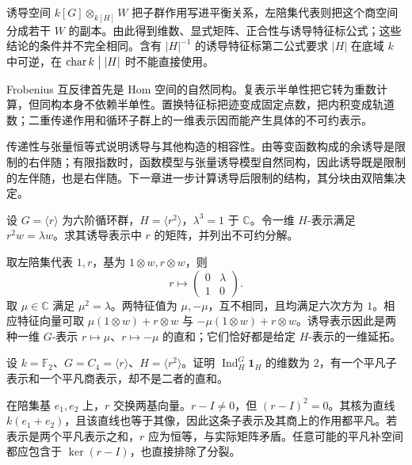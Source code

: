 




\begin{chaptersummary}
	诱导空间 \(k[G]\otimes_{k[H]}W\) 把子群作用写进平衡关系，左陪集代表则把这个商空间分成若干 \(W\) 的副本。由此得到维数、显式矩阵、正合性与诱导特征标公式；这些结论的条件并不完全相同。含有 \(|H|^{-1}\) 的诱导特征标第二公式要求 \(|H|\) 在底域 \(k\) 中可逆，在 \(\operatorname{char}k\bigm\vert |H|\) 时不能直接使用。

	\ProseParagraphBreak
	Frobenius 互反律首先是 Hom 空间的自然同构。复表示半单性把它转为重数计算，但同构本身不依赖半单性。置换特征标把迹变成固定点数，把内积变成轨道数；二重传递作用和循环子群上的一维表示因而能产生具体的不可约表示。

	\ProseParagraphBreak
	传递性与张量恒等式说明诱导与其他构造的相容性。由等变函数构成的余诱导是限制的右伴随；有限指数时，函数模型与张量诱导模型自然同构，因此诱导既是限制的左伴随，也是右伴随。下一章进一步计算诱导后限制的结构，其分块由双陪集决定。
\end{chaptersummary}

\BookExercises

\begin{exercise}\label{b5:ex:03-cyclic-matrix}
	设 \(G=\langle r\rangle\) 为六阶循环群，\(H=\langle r^2\rangle\)，\(\lambda^3=1\) 于 \(\mathbb C\)。令一维 \(H\)-表示满足 \(r^2w=\lambda w\)。求其诱导表示中 \(r\) 的矩阵，并列出不可约分解。
\end{exercise}
\begin{solution}
	取左陪集代表 \(1,r\)，基为 \(1\otimes w,r\otimes w\)，则
	\[
		r\longmapsto\begin{pmatrix}0&\lambda\\1&0\end{pmatrix}.
	\]
	取 \(\mu\in\mathbb C\) 满足 \(\mu^2=\lambda\)。两特征值为 \(\mu,-\mu\)，互不相同，且均满足六次方为 \(1\)。相应特征向量可取 \(\mu(1\otimes w)+r\otimes w\) 与 \(-\mu(1\otimes w)+r\otimes w\)。诱导表示因此是两种一维 \(G\)-表示 \(r\mapsto\mu\)、\(r\mapsto-\mu\) 的直和；它们恰好都是给定 \(H\)-表示的一维延拓。
\end{solution}

\begin{exercise}\label{b5:ex:03-modular-cyclic}
	设 \(k=\mathbb F_2\)、\(G=C_4=\langle r\rangle\)、\(H=\langle r^2\rangle\)。证明 \(\operatorname{Ind}_H^G\mathbf1_H\) 的维数为 \(2\)，有一个平凡子表示和一个平凡商表示，却不是二者的直和。
\end{exercise}
\begin{solution}
	在陪集基 \(e_1,e_2\) 上，\(r\) 交换两基向量。\(r-I\ne0\)，但 \((r-I)^2=0\)。其核为直线 \(k(e_1+e_2)\)，且该直线也等于其像，因此这条子表示及其商上的作用都平凡。若表示是两个平凡表示之和，\(r\) 应为恒等，与实际矩阵矛盾。任意可能的平凡补空间都应包含于 \(\ker(r-I)\)，也直接排除了分裂。
\end{solution}

